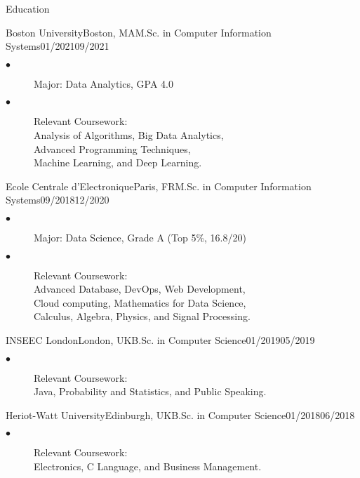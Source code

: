 \documentclass{resume}
\begin{document}
	\begin{multicols}{2}

	\begin{rSection}{\Large Education}
		\begin{school}{Boston University}{Boston, MA}{M.Sc. in Computer Information Systems}{01/2021}{09/2021}{
			\begin{description}
				\item[$\bullet$]Major:  Data Analytics, GPA 4.0
				\item[$\bullet$]{Relevant Coursework: \\
				Analysis of Algorithms, Big Data Analytics, \\
				Advanced Programming Techniques,  \\
				Machine Learning, and Deep Learning.}
			\end{description}
		}
		\end{school}
		
		\begin{school}{Ecole Centrale d'Electronique}{Paris, FR}{M.Sc. in Computer Information Systems}{09/2018}{12/2020}{
			\begin{description}
				\item[$\bullet$]Major: Data Science, Grade A  (Top 5\%, 16.8/20)
				\item[$\bullet$]{Relevant Coursework: \\
				Advanced Database, DevOps, Web Development,\\
				Cloud computing, Mathematics for Data Science,\\
				Calculus, Algebra, Physics, and Signal Processing.}
			\end{description}
		}
		\end{school}
		\begin{school}{INSEEC London}{London, UK}{B.Sc. in Computer Science}{01/2019}{05/2019}{
			\begin{description}
				\item[$\bullet$]{Relevant Coursework: \\
				Java, Probability and Statistics, and Public Speaking.}
			\end{description}
		}
		\end{school}
		\begin{school}{Heriot-Watt University}{Edinburgh, UK}{B.Sc. in Computer Science}{01/2018}{06/2018}{
			\begin{description}
				\item[$\bullet$]{Relevant Coursework: \\
				Electronics, C Language, and Business Management.}
			\end{description}
		}
		\end{school}
	\end{rSection}


\end{multicols}
\end{document}
